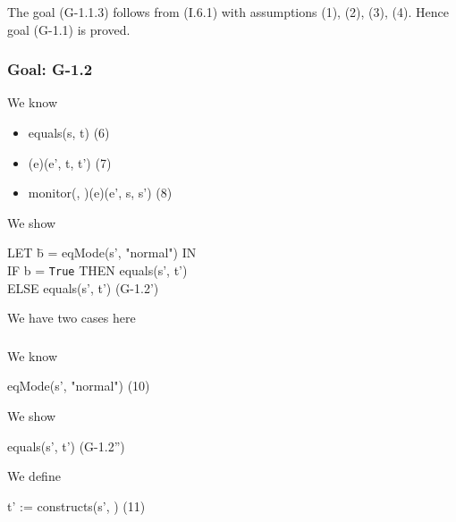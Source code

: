 \documentclass[conference]{IEEEtran}
\begin{document}
\noindent The goal (G-1.1.3) follows from (I.6.1) with assumptions (1), (2), (3), (4). Hence goal (G-1.1) is proved. 

\subsubsection*{Goal: G-1.2}

\noindent We know

\begin{itemize}
\item equals(s, t)  \hspace*{3cm} (6)
\item \textlbrackdbl \textrbrackdbl(e)(e', t, t')  \hspace*{2.2cm} (7)
\item monitor(, )(e)(e', s, s')  \hspace*{0.9cm} (8)
\end{itemize}

\noindent We show
\begin{center}
\begin{tabbing}
LET \=b = eqMode(s', "normal") IN
\\\>IF b = \texttt{True} THEN equals(s', t') 
\\\>ELSE  equals(s', t')
 \hspace*{2cm} (G-1.2')
 \end{tabbing}
\end{center}

\noindent We have two cases here

\subsubsection*{} 

\noindent We know

\begin{center}
eqMode(s', "normal")  \hspace*{1cm} (10)
\end{center}
\noindent We show
\begin{center}
equals(s', t')  \hspace*{2cm} (G-1.2'')
\end{center}

\noindent We define

\begin{center}
t' := constructs(s', )  \hspace*{0.9cm} (11)
\end{center}
\end{document}
